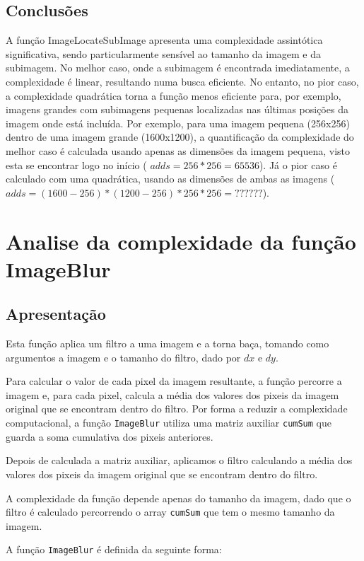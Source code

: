 \documentclass{report}
\begin{document}
\subsection{Conclusões}

A função ImageLocateSubImage apresenta uma complexidade assintótica significativa, sendo particularmente sensível ao tamanho da imagem e da subimagem. No melhor caso, onde a subimagem é encontrada imediatamente, a complexidade é linear, resultando numa busca eficiente. No entanto, no pior caso, a complexidade quadrática torna a função menos eficiente para, por exemplo, imagens grandes com subimagens pequenas localizadas nas últimas posições da imagem onde está incluída. Por exemplo, para uma imagem pequena (256x256) dentro de uma imagem grande (1600x1200), a quantificação da complexidade do melhor caso é calculada usando apenas as dimensões da imagem pequena, visto esta se encontrar logo no início (  \texttt{$adds = 256*256 = 65536$}). Já o pior caso é calculado com uma quadrática, usando as dimensões de ambas as imagens (\texttt{$adds = (1600-256) * (1200-256) * 256 * 256 = ?????? $}).


\newpage


\section{Analise da complexidade da função ImageBlur}

\subsection{Apresentação}
Esta função aplica um filtro a uma imagem e a torna baça, tomando como argumentos a imagem e o tamanho do filtro, dado por \(dx\) e \(dy\).
\par
Para calcular o valor de cada pixel da imagem resultante, a função percorre a imagem e, para cada pixel,
calcula a média dos valores dos pixeis da imagem original que se encontram dentro do filtro. Por forma a reduzir a complexidade computacional,
a função \texttt{ImageBlur} utiliza uma matriz auxiliar \texttt{cumSum} que guarda a soma cumulativa dos pixeis anteriores.
\par
Depois de calculada a matriz auxiliar, aplicamos o filtro calculando a média dos valores dos pixeis da imagem original que se encontram dentro do filtro.
\par
A complexidade da função depende apenas do tamanho da imagem, dado que o filtro é calculado percorrendo o array \texttt{cumSum} 
que tem o mesmo tamanho da imagem.
\par
A função \texttt{ImageBlur} é definida da seguinte forma:
\end{document}

